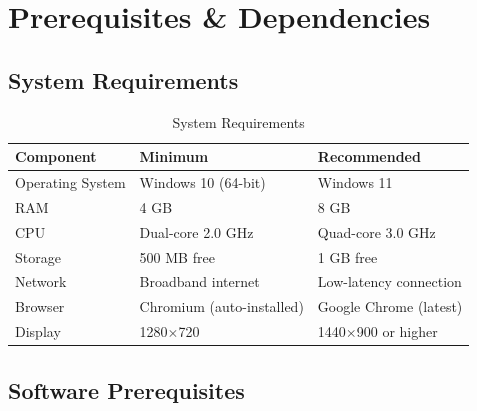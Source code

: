 \documentclass[12pt,a4paper]{article}
\begin{document}
\section{Prerequisites \& Dependencies}
\label{sec:prerequisites}

\subsection{System Requirements}
\label{subsec:system-requirements}

\begin{table}[H]
\centering
\caption{System Requirements}
\label{tab:system-requirements}
\begin{tabularx}{\textwidth}{l X X}
\toprule
\textbf{Component} & \textbf{Minimum} & \textbf{Recommended} \\
\midrule
Operating System & Windows 10 (64-bit) & Windows 11 \\
RAM & 4 GB & 8 GB \\
CPU & Dual-core 2.0 GHz & Quad-core 3.0 GHz \\
Storage & 500 MB free & 1 GB free \\
Network & Broadband internet & Low-latency connection \\
Browser & Chromium (auto-installed) & Google Chrome (latest) \\
Display & 1280$\times$720 & 1440$\times$900 or higher \\
\bottomrule
\end{tabularx}
\end{table}

\subsection{Software Prerequisites}
\label{subsec:software-prerequisites}
\end{document}
